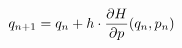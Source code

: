 \documentclass[preview]{standalone}
\begin{document}
\begin{align*}
\special{dvisvgm:raw <g id='unique000'>}q_{n+1} = q_n + h \cdot \frac{\partial H}{\partial p}(q_n, p_n)\special{dvisvgm:raw </g>}
\end{align*}
\end{document}
